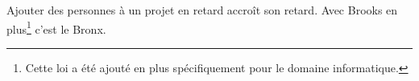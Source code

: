 %
    {Ajouter des personnes à un projet en retard accroît son retard.}%
    {Avec Brooks en plus\footnote{Cette loi a été ajouté en plus spécifiquement pour le domaine informatique.} c'est le Bronx.}
